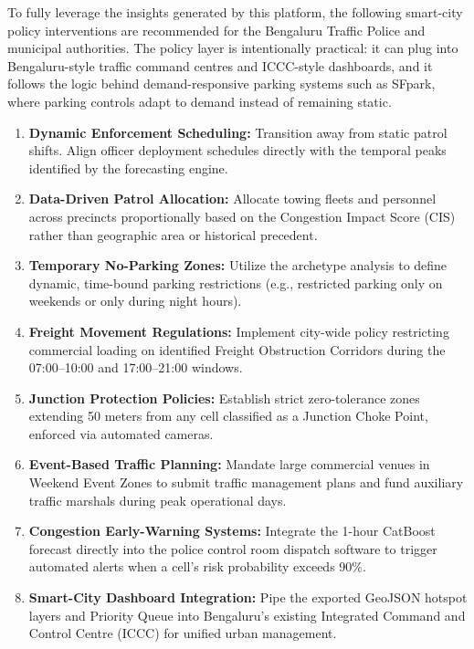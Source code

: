 \documentclass[12pt,a4paper]{article}
\begin{document}
To fully leverage the insights generated by this platform, the following smart-city policy interventions are recommended for the Bengaluru Traffic Police and municipal authorities. The policy layer is intentionally practical: it can plug into Bengaluru-style traffic command centres and ICCC-style dashboards, and it follows the logic behind demand-responsive parking systems such as SFpark, where parking controls adapt to demand instead of remaining static.

\begin{enumerate}[leftmargin=1.5em]
  \item \textbf{Dynamic Enforcement Scheduling:} Transition away from static patrol shifts. Align officer deployment schedules directly with the temporal peaks identified by the forecasting engine.
  \item \textbf{Data-Driven Patrol Allocation:} Allocate towing fleets and personnel across precincts proportionally based on the Congestion Impact Score (CIS) rather than geographic area or historical precedent.
  \item \textbf{Temporary No-Parking Zones:} Utilize the archetype analysis to define dynamic, time-bound parking restrictions (e.g., restricted parking only on weekends or only during night hours).
  \item \textbf{Freight Movement Regulations:} Implement city-wide policy restricting commercial loading on identified Freight Obstruction Corridors during the 07:00--10:00 and 17:00--21:00 windows.
  \item \textbf{Junction Protection Policies:} Establish strict zero-tolerance zones extending 50 meters from any cell classified as a Junction Choke Point, enforced via automated cameras.
  \item \textbf{Event-Based Traffic Planning:} Mandate large commercial venues in Weekend Event Zones to submit traffic management plans and fund auxiliary traffic marshals during peak operational days.
  \item \textbf{Congestion Early-Warning Systems:} Integrate the 1-hour CatBoost forecast directly into the police control room dispatch software to trigger automated alerts when a cell's risk probability exceeds 90\%.
  \item \textbf{Smart-City Dashboard Integration:} Pipe the exported GeoJSON hotspot layers and Priority Queue into Bengaluru's existing Integrated Command and Control Centre (ICCC) for unified urban management.
\end{enumerate}
\end{document}
